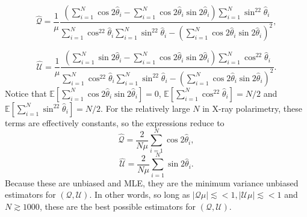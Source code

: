 \begin{equation}
    \hat{\mathcal{Q}} = \frac{1}{\mu}\frac{(\sum^N_{i=1}\cos2\hat{\theta}_i -  \sum^N_{i=1}\cos2\hat{\theta}_i\sin2\hat{\theta}_i) \sum^N_{i=1}\sin^22\hat{\theta}_i}
    {\sum^N_{i=1}\cos^22\hat{\theta}_i \sum^N_{i=1}\sin^22\hat{\theta}_i - (\sum^N_{i=1}\cos2\hat{\theta}_i\sin2\hat{\theta}_i)^2},
    \label{eqn:qquadform}
\end{equation}

\begin{equation}
    \hat{\mathcal{U}} =  \frac{1}{\mu}\frac{(\sum^N_{i=1}\sin2\hat{\theta}_i -  \sum^N_{i=1}\cos2\hat{\theta}_i\sin2\hat{\theta}_i) \sum^N_{i=1}\cos^22\hat{\theta}_i}
    {\sum^N_{i=1}\cos^22\hat{\theta}_i \sum^N_{i=1}\sin^22\hat{\theta}_i - (\sum^N_{i=1}\cos2\hat{\theta}_i\sin2\hat{\theta}_i)^2}.
    \label{eqn:uquadform}
\end{equation}
Notice that $\mathbb{E}[\sum_{i=1}^N\cos2\hat{\theta}_i\sin2\hat{\theta}_i] = 0$, $\mathbb{E}[\sum_{i=1}^N\cos^22\hat{\theta}_i] = N/2$ and $\mathbb{E}[\sum_{i=1}^N\sin^22\hat{\theta}_i] = N/2$. For the relatively large $N$ in X-ray polarimetry, these terms are effectively constants, so the expressions reduce to
\begin{equation}
    \hat{\mathcal{Q}} = \frac{2}{N\mu} \sum^N_{i=1}\cos2\hat{\theta}_i,
    \label{eqn:qest}
\end{equation}
\begin{equation}
    \hat{\mathcal{U}} = \frac{2}{N\mu} \sum^N_{i=1}\sin2\hat{\theta}_i.
    \label{eqn:uest}
\end{equation}
Because these are unbiased and MLE, they are the minimum variance unbiased estimators for $(\mathcal{Q}, \mathcal{U})$. In other words, so long as $|\mathcal{Q}\mu| \lesssim < 1, |\mathcal{U}\mu| \lesssim < 1$ and $N \gtrsim 1000$, these are the best possible estimators for $(\mathcal{Q}, \mathcal{U})$.

